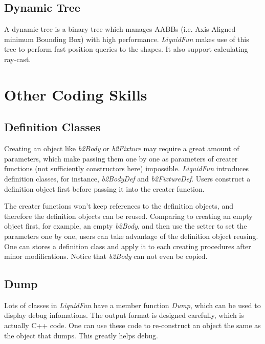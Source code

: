 \documentclass[UTF8]{ctexart}
\begin{document}
        \subsection{Dynamic Tree}

            A dynamic tree is a binary tree which manages AABBs (i.e. Axis-Aligned minimum Bounding Box) with high performance. \textit{LiquidFun} makes use of this tree to perform fast position queries to the shapes. It also support calculating ray-cast.

    \section{Other Coding Skills}
        
        \subsection{Definition Classes}

            Creating an object like \textit{b2Body} or \textit{b2Fixture} may require a great amount of parameters, which make passing them one by one as parameters of creater functions (not sufficiently constructors here) impossible. \textit{LiquidFun} introduces definition classes, for instance, \textit{b2BodyDef} and \textit{b2FixtureDef}. Users construct a definition object first before passing it into the creater function.

            The creater functions won't keep references to the definition objects, and therefore the definition objects can be reused. Comparing to creating an empty object first, for example, an empty \textit{b2Body}, and then use the setter to set the parameters one by one, users can take advantage of the definition object reusing. One can stores a definition class and apply it to each creating procedures after minor modifications. Notice that \textit{b2Body} can not even be copied.

        \subsection{Dump}

            Lots of classes in \textit{LiquidFun} have a member function \textit{Dump}, which can be used to display debug infomations. The output format is designed carefully, which is actually C++ code. One can use these code to re-construct an object the same as the object that dumps. This greatly helps debug.
\end{document}
